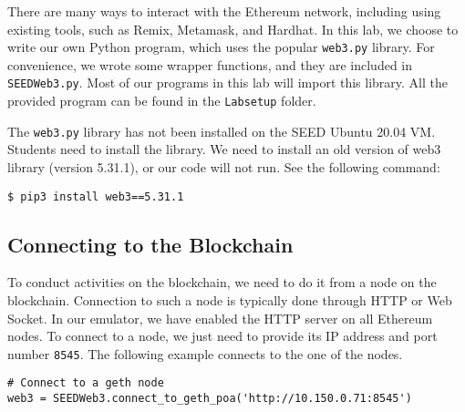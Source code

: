 There are many ways to interact with the Ethereum network,
including using existing tools, such as Remix, Metamask, and Hardhat.
In this lab, we choose to write our own Python program, 
which uses the popular \texttt{web3.py} library. 
For convenience, we wrote some wrapper functions, and 
they are included in \texttt{SEEDWeb3.py}.  Most of our
programs in this lab will import this library. 
All the provided program can be found in the
\texttt{Labsetup} folder.  


The \texttt{web3.py} library has not been installed on the SEED Ubuntu 20.04 VM. 
Students need to install the library. 
We need to install an old version of web3 library (version 5.31.1), 
or our code will not run. See the following command: 

\begin{lstlisting}
$ pip3 install web3==5.31.1
\end{lstlisting}





\subsection{Connecting to the Blockchain} 
\label{sec:sub:ports}



To conduct activities on the blockchain, we need to 
do it from a node on the blockchain. Connection to
such a node is typically done through HTTP or Web Socket. 
In our emulator, we have enabled the HTTP server on
all Ethereum nodes. 
To connect to a node, we just need to provide its IP address 
and port number \texttt{8545}. 
The following example connects to the one of the nodes.

\begin{lstlisting}
# Connect to a geth node
web3 = SEEDWeb3.connect_to_geth_poa('http://10.150.0.71:8545')
\end{lstlisting}



